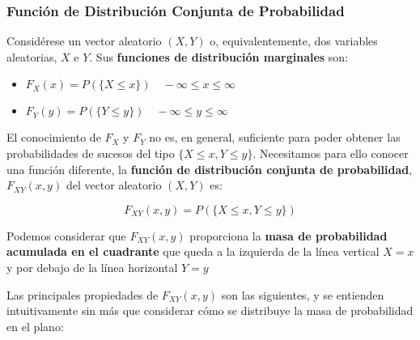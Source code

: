 \documentclass[11pt]{article}
\providecommand{\tightlist}{%
      \setlength{\itemsep}{0pt}\setlength{\parskip}{0pt}}
\begin{document}
    \hypertarget{funciuxf3n-de-distribuciuxf3n-conjunta-de-probabilidad}{%
\subsubsection{Función de Distribución Conjunta de
Probabilidad}\label{funciuxf3n-de-distribuciuxf3n-conjunta-de-probabilidad}}

Considérese un vector aleatorio \((X, Y)\) o, equivalentemente, dos
variables aleatorias, \(X\) e \(Y\). Sus \textbf{funciones de
distribución marginales} son:

\begin{itemize}
\tightlist
\item
  \(F_X(x) = P(\{X\leq x\}) \quad -\infty \leq x \leq \infty\)
\item
  \(F_Y(y) = P(\{Y\leq y\}) \quad -\infty \leq y \leq \infty\)
\end{itemize}

El conocimiento de \(F_X\) y \(F_Y\) no es, en general, suficiente para
poder obtener las probabilidades de sucesos del tipo
\(\{X\leq x, Y\leq y\}\). Necesitamos para ello conocer una función
diferente, la \textbf{función de distribución conjunta de probabilidad},
\(F_{XY}(x,y)\) del vector aleatorio \((X, Y)\) es:

\[F_{XY}(x,y) = P\left(\{X\leq x, Y\leq y\}\right)\]

Podemos considerar que \(F_{XY}(x,y)\) proporciona la \textbf{masa de
probabilidad acumulada en el cuadrante} que queda a la izquierda de la
línea vertical \(X = x\) y por debajo de la línea horizontal \(Y = y\)

    Las principales propiedades de \(F_{XY}(x,y)\) son las siguientes, y se
entienden intuitivamente sin más que considerar cómo se distribuye la
masa de probabilidad en el plano:
\end{document}

